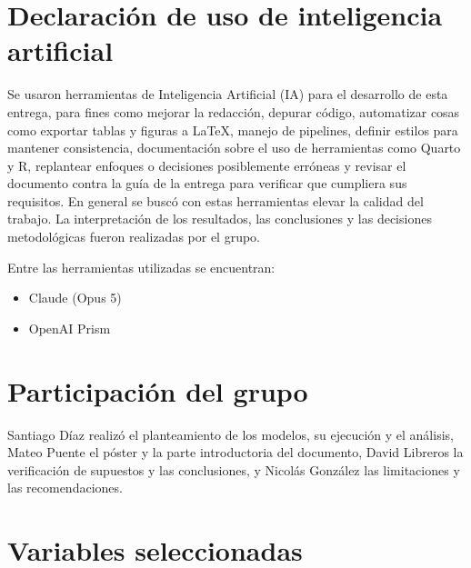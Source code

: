 \documentclass[12pt]{article}
\begin{document}
\newpage

\section{Declaración de uso de inteligencia artificial}
Se usaron herramientas de Inteligencia Artificial (IA) para el desarrollo de esta entrega, para fines como mejorar la redacción, 
depurar código, automatizar cosas como exportar tablas y figuras a \LaTeX, manejo de pipelines, definir estilos para mantener consistencia,
documentación sobre el uso de herramientas como Quarto y R, replantear enfoques o decisiones posiblemente erróneas y revisar
el documento contra la guía de la entrega para verificar que cumpliera sus requisitos.
En general se buscó con estas herramientas elevar la calidad del trabajo. La interpretación de los
resultados, las conclusiones y las decisiones metodológicas fueron realizadas por el grupo.

Entre las herramientas utilizadas se encuentran:
\begin{itemize}
  \item Claude (Opus 5)
  \item OpenAI Prism
\end{itemize}

\vspace{0.1cm}

\section{Participación del grupo}

Santiago Díaz realizó el planteamiento de los modelos, su ejecución y el análisis, Mateo Puente
el póster y la parte introductoria del documento, David Libreros la verificación de supuestos y
las conclusiones, y Nicolás González las limitaciones y las recomendaciones.

\vspace{0.1cm}

\section{Variables seleccionadas}
\label{anexo:variables}
\end{document}
